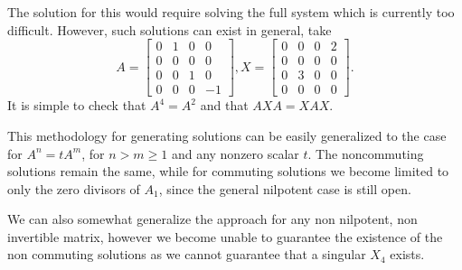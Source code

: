 \documentclass{article}
\begin{document}
\begin{algorithm}
  \begin{case}
    The solution for this would require solving the full system which is currently too difficult.
    However, such solutions can exist in general, take
    \[A = \begin{bmatrix} 0 & 1 & 0 & 0\\ 0 & 0 & 0 & 0\\ 0 & 0 & 1 & 0\\ 0 & 0 & 0 & -1 \end{bmatrix}, X = \begin{bmatrix} 0 & 0 & 0 & 2\\ 0 & 0 & 0 & 0\\ 0 & 3 & 0 & 0\\ 0 & 0 & 0 & 0 \end{bmatrix}.\]
    It is simple to check that $A^4 = A^2$ and that $A X A = X A X$.
  \end{case}
\end{algorithm}

\begin{remark}
  This methodology for generating solutions can be easily generalized to the case for $A^n = t A^m$, for $n > m \ge 1$ and any nonzero scalar $t$.
  The noncommuting solutions remain the same, while for commuting solutions we become limited to only the zero divisors of $A_1$, since the general nilpotent case is still open.

  We can also somewhat generalize the approach for any non nilpotent, non invertible matrix, however we become unable to guarantee the existence of the non commuting solutions as we cannot guarantee that a singular $X_4$ exists.
\end{remark}
\end{document}

